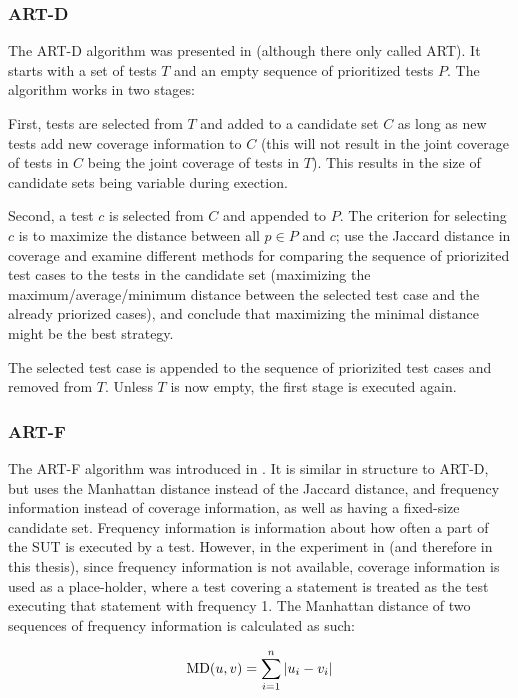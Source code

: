 \subsubsection{ART-D}

The ART-D algorithm was presented in \cite{jiang2009adaptive} (although
there only called ART). It starts with a set of tests $T$ and an empty
sequence of prioritized tests $P$. The algorithm works in two stages:

First, tests are selected from $T$ and added to a candidate set $C$
as long as new tests add new coverage information to $C$ (this will not
result in the joint coverage of tests in $C$ being the joint coverage of
tests in $T$). This results in the size of candidate sets being variable
during exection.

Second, a test $c$ is selected from $C$ and appended to $P$. The
criterion for selecting $c$ is to maximize the distance between all $p
\in P$ and $c$; \cite{jiang2009adaptive} use the Jaccard distance in
coverage and examine different methods for comparing the sequence of
priorizited test cases to the tests in the candidate set (maximizing
the maximum/average/minimum distance between the selected test case and
the already priorized cases), and conclude that maximizing the minimal
distance might be the best strategy.

The selected test case is appended to the sequence of priorizited test
cases and removed from $T$. Unless $T$ is now empty, the first stage is
executed again.

\subsubsection{ART-F}

The ART-F algorithm was introduced in \cite{zhou2012fault}. It is
similar in structure to ART-D, but uses the Manhattan distance instead
of the Jaccard distance, and frequency information instead of coverage
information, as well as having a fixed-size candidate set. Frequency
information is information about how often a part of the SUT is executed
by a test. However, in the experiment in \cite{cruciani2019scalable} (and
therefore in this thesis), since frequency information is not available,
coverage information is used as a place-holder, where a test covering a
statement is treated as the test executing that statement with frequency
1. The Manhattan distance of two sequences of frequency information is
calculated as such:

$$\hbox{MD}(u, v)=\sum_{i=1}^{n}|u_i-v_i|$$


